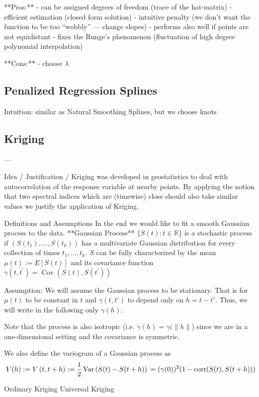 **Pros:**
- can be assigned degrees of freedom (trace of the hat-matrix)
- efficient estimation (closed form solution)
- intuitive penalty (we don't want the function to be too ``wobbly'' --- change slopes)
- performs also well if points are not equidistant
- fixes the Runge's phenomenon (fluctuation of high degree polynomial interpolation)

**Cons:**
- choose $\lambda$

\subsection{Penalized Regression Splines}
\label{sec:Penalized}
Intuition: similar as Natural Smoothing Splines, but we choose knots

\subsection{Kriging}
\label{sec:Kriging}
---
\cite{diggleGaussianModelsGeostatistical2007}

Idea / Justification /
Kriging was developed in geostatistics to deal with autocorrelation of the response variable at nearby points. By applying the notion that two spectral indices which are (timewise) close should also take similar values we justify the application of Kriging.

Definitions and Assumptions
In the end we would like to fit a smooth Gaussian process to the data.
**Gaussian Process** $\{S(t) : t\in \mathbb R\} $ is a stochastic process if $(S(t_1),\dots,S(t_k))$ has a multivariate Gaussian distribution for every collection of times ${t_1, \dots , t_k}$.
$S$ can be fully characterized by the mean $\mu(t):=E[S(t)]$ and its covariance function $\gamma\left(t, t^{\prime}\right)=\operatorname{Cov}\left(S(t), S\left(t^{\prime}\right)\right)$

Assumption:
We will assume the Gaussian process to be stationary. That is for $\mu(t)$ to be constant in $t$ and $\gamma(t,t')$ to depend only on $h=t-t'$. Thus, we will write in the following only $\gamma(h)$.

Note that the process is also isotropic (i.e. $\gamma(h)=\gamma(\|h\|$) since we are in a one-dimensional setting and the covariance is symmetric.

We also define the variogram of a Gaussian process as
$$V(h):=V\left(t, t+h\right):=\frac{1}{2} \operatorname{Var}\left(S(t)-S(t+h)\right)\\ %
    =(\gamma(0))^2(1-\operatorname{corr}(S(t),S(t+h)))$$





Ordinary Kriging
Universal Kriging
